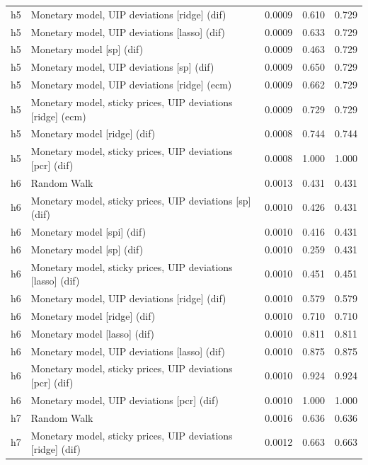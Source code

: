 \begin{ThreePartTable}
\begin{longtable}[t]{cp{5.5cm}ccc}
h5 & \raggedright Monetary model, UIP deviations [ridge] (dif) & 0.0009 & 0.610 & 0.729\\
h5 & \raggedright Monetary model, UIP deviations [lasso] (dif) & 0.0009 & 0.633 & 0.729\\
h5 & \raggedright Monetary model [sp] (dif) & 0.0009 & 0.463 & 0.729\\
h5 & \raggedright Monetary model, UIP deviations [sp] (dif) & 0.0009 & 0.650 & 0.729\\
h5 & \raggedright Monetary model, UIP deviations [ridge] (ecm) & 0.0009 & 0.662 & 0.729\\
h5 & \raggedright Monetary model, sticky prices, UIP deviations [ridge] (ecm) & 0.0009 & 0.729 & 0.729\\
h5 & \raggedright Monetary model [ridge] (dif) & 0.0008 & 0.744 & 0.744\\
h5 & \raggedright Monetary model, sticky prices, UIP deviations [pcr] (dif) & 0.0008 & 1.000 & 1.000\\
\addlinespace
h6 & \raggedright Random Walk & 0.0013 & 0.431 & 0.431\\
h6 & \raggedright Monetary model, sticky prices, UIP deviations [sp] (dif) & 0.0010 & 0.426 & 0.431\\
h6 & \raggedright Monetary model [spi] (dif) & 0.0010 & 0.416 & 0.431\\
h6 & \raggedright Monetary model [sp] (dif) & 0.0010 & 0.259 & 0.431\\
h6 & \raggedright Monetary model, sticky prices, UIP deviations [lasso] (dif) & 0.0010 & 0.451 & 0.451\\
h6 & \raggedright Monetary model, UIP deviations [ridge] (dif) & 0.0010 & 0.579 & 0.579\\
h6 & \raggedright Monetary model [ridge] (dif) & 0.0010 & 0.710 & 0.710\\
h6 & \raggedright Monetary model [lasso] (dif) & 0.0010 & 0.811 & 0.811\\
h6 & \raggedright Monetary model, UIP deviations [lasso] (dif) & 0.0010 & 0.875 & 0.875\\
h6 & \raggedright Monetary model, sticky prices, UIP deviations [pcr] (dif) & 0.0010 & 0.924 & 0.924\\
h6 & \raggedright Monetary model, UIP deviations [pcr] (dif) & 0.0010 & 1.000 & 1.000\\
\addlinespace
h7 & \raggedright Random Walk & 0.0016 & 0.636 & 0.636\\
h7 & \raggedright Monetary model, sticky prices, UIP deviations [ridge] (dif) & 0.0012 & 0.663 & 0.663\\

\end{longtable}
\end{ThreePartTable}
